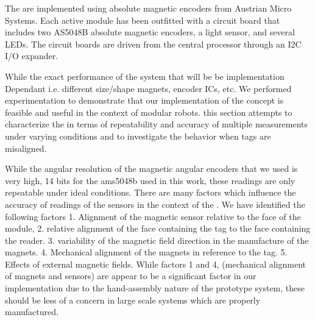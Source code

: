 The \tagNamePlural are implemented using absolute magnetic encoders from Austrian Micro Systems. Each active module has been outfitted with a circuit board that
includes two AS5048B absolute magnetic encoders, a light sensor, and several LEDs. The circuit boards are driven from the central processor 
through an I2C I/O expander.


While the exact performance of the \tagName system that will be be implementation Dependant i.e. different size/shape magnets, encoder ICs, etc. We performed experimentation to demonstrate that our implementation of the \tagName concept is feasible and useful in the context of modular robots. this section attempts to characterize the \tagNamePlural in terms of repeatability and accuracy of multiple measurements under varying conditions and to investigate the behavior when tags are misaligned. 

While the angular resolution of the magnetic angular encoders that we used is very high, 14 bits for the ams5048b used in this work, these readings are only repeatable under ideal conditions. There are many factors which influence the accuracy of readings of the sensors in the context of the \tagNamePlural. We have identified the following factors 1. Alignment of the magnetic sensor relative to the face of the module, 2. relative alignment of the face containing the tag to the face containing the reader. 3. variability of the magnetic field direction in the manufacture of the magnets. 4. Mechanical alignment of the magnets in reference to the tag. 5. Effects of external magnetic fields. While factors 1 and 4, (mechanical alignment of magnets and sensors) are appear to be a significant factor in our implementation due to the hand-assembly nature of the prototype system, these should be less of a concern in large scale systems which are properly manufactured.

